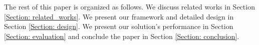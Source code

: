 
The rest of this paper is organized as follows. We discuss related works in Section \ref{Section: related_works}. We present our framework and detailed design in Section \ref{Section: design}. We present our solution's performance in Section \ref{Section: evaluation} and conclude the paper in Section \ref{Section: conclusion}.

